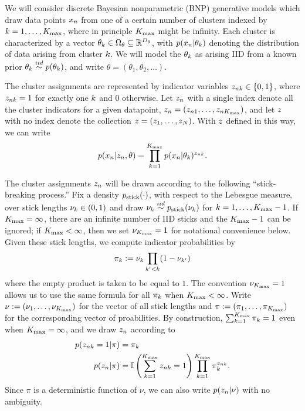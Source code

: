 We will consider discrete Bayesian nonparametric (BNP) generative models which
draw data points $x_n$ from one of a certain number of clusters indexed by $k =
1, \ldots, {K_{\mathrm{max}}}$, where in principle ${K_{\mathrm{max}}}$ might be infinity.  Each cluster
is characterized by a vector $\theta_k \in \Omega_{\theta} \subseteq
\mathbb{R}^{D_{\theta}}$, with $p(x_n \vert \theta_k)$ denoting the
distribution of data arising from  cluster $k$. We will model the $\theta_k$
as arising IID from a known prior $\theta_k \overset{iid}{\sim} p(\theta_k)$, and write
$\theta = (\theta_1, \theta_2, \ldots)$.

The cluster assignments are represented by indicator variables $z_{nk} \in
\{0, 1\}$, where $z_{nk} = 1$ for exactly one $k$ and $0$ otherwise.  Let
$z_n$ with a single index denote all the cluster indicators for a given
datapoint, $z_n = (z_{n1}, \ldots, z_{n{K_{\mathrm{max}}}})$, and let $z$ with no
index denote the collection $z = (z_1, \ldots, z_N)$.  With $z$ defined in
this way, we can write
%
\begin{align*}
%
p(\x_n \vert \z_\n, \theta) =
    \prod_{k=1}^\kmax p(\x_n \vert \theta_\k)^{\z_{\n\k}}.
%
\end{align*}


The cluster assignments $z_{n}$ will be drawn according to the following
``stick-breaking process.''  Fix a density $p_{\mathrm{stick}}(\cdot)$, with respect to the
Lebesgue measure, over stick lengths $\nu_k \in (0, 1)$ and draw $\nu_k \overset{iid}{\sim}
p_{\mathrm{stick}}(\nu_k)$ for $k=1,\ldots,{K_{\mathrm{max}}} - 1$.  If ${K_{\mathrm{max}}} = \infty$, there are an
infinite number of IID sticks and the ${K_{\mathrm{max}}} - 1$ can be ignored; if ${K_{\mathrm{max}}} <
\infty$, then we set $\nu_{K_{\mathrm{max}}} = 1$ for notational convenience below.  Given
these stick lengths, we compute indicator probabilities by
%
\begin{align*}
%
\pi_\k := \nu_\k \prod_{\k' < \k} (1 - \nu_{\k'})
%
\end{align*}
%
where the empty product is taken to be equal to $1$. The convention $\nu_{K_{\mathrm{max}}} =
1$ allows us to use the same formula for all $\pi_k$ when ${K_{\mathrm{max}}} < \infty$.
Write $\nu := (\nu_1, \ldots, \nu_{K_{\mathrm{max}}})$ for the vector of all stick lengths
and $\pi := (\pi_1, \ldots, \pi_{K_{\mathrm{max}}})$ for the corresponding vector of
proabilities. By construction, $\sum_{k=1}^{{K_{\mathrm{max}}}} \pi_k = 1$ even when ${K_{\mathrm{max}}} =
\infty$, and we draw $z_n$ according to
%
\begin{align*}
%
p(\z_{\n\k} = 1 \vert \pi) ={}& \pi_\k \\
p(\z_\n \vert \pi) ={}&
    \ind{\sum_{\k=1}^{\kmax} \z_{\n\k} = 1}
    \prod_{k=1}^{\kmax} \pi_\k^{\z_{\n\k}}.
%
\end{align*}
%
Since $\pi$ is a deterministic function of $\nu$, we can also write
$p(z_n \vert \nu)$ with no ambiguity.

